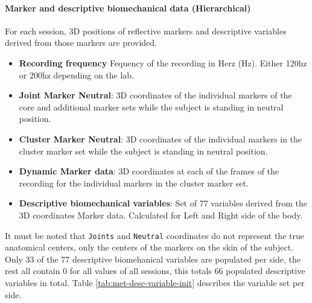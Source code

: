 \paragraph{Marker and descriptive biomechanical data (Hierarchical)} For each session, 3D positions of reflective markers and descriptive variables derived from those markers are provided.
\begin{itemize}
    \item \textbf{Recording frequency} Fequency of the recording in Herz (Hz). Either 120hz or 200hz depending on the lab.
    \item \textbf{Joint Marker Neutral}: 3D coordinates of the individual markers of the core and additional marker sets while the subject is standing in neutral position.
    \item \textbf{Cluster Marker Neutral}: 3D coordinates of the individual markers in the cluster marker set while the subject is standing in neutral position.
    \item \textbf{Dynamic Marker data}: 3D coordinates at each of the frames of the recording for the individual markers in the cluster marker set.
    \item \textbf{Descriptive biomechanical variables}: Set of 77 variables derived from the 3D coordinates Marker data. Calculated for Left and Right side of the body.
\end{itemize}

It must be noted that \texttt{Joints} and \texttt{Neutral} coordinates do not represent the true anatomical centers, only the centers of the markers on the skin of the subject.
Only 33 of the 77 descriptive biomehanical variables are populated per side, the rest all contain 0 for all values of all sessions, this totals 66 populated descriptive variables in total. Table \ref{tab:met-desc-variable-init} describes the variable set per side.

